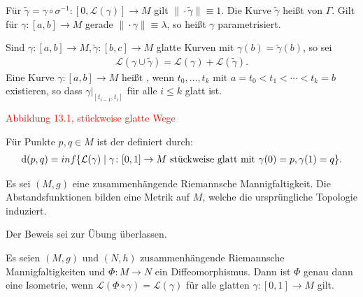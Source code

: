 Für $\tilde\gamma = \gamma \circ \sigma^{-1}\colon [0,\mathcal L(\gamma)] \to M$ gilt $\|\cdot\tilde\gamma\| \equiv 1$.
Die Kurve $\tilde \gamma$ heißt  von $\Gamma$.
Gilt für $\gamma \colon [a,b] \to M$ gerade $\|\cdot\gamma\| \equiv \lambda$, so heißt $\gamma$  parametrisiert.

Sind $\gamma \colon [a,b] \to M, \tilde \gamma \colon [b,c] \to M$ glatte Kurven mit $\gamma(b) = \tilde \gamma(b)$, so sei
\begin{align*}
  \mathcal L(\gamma \cup \tilde\gamma) = \mathcal L(\gamma) + \mathcal L(\tilde \gamma).
\end{align*}
Eine Kurve $\gamma \colon [a,b] \to M$ heißt , wenn $t_0, \ldots, t_k$ mit $a = t_0 < t_1 < \cdots < t_k = b$ existieren, so dass $\gamma|_{[t_{i-1},t_i]}$ für alle $i \leq k$ glatt ist.

\textcolor{red}{Abbildung 13.1, stückweise glatte Wege}

\begin{Dfn}
  Für Punkte $p, q \in M$ ist der  definiert durch:
  \begin{align*}
    \mathrm{d}(p,q) = inf\{ \mathcal L(\gamma) \mid \gamma \colon [0,1] \to M \text{ stückweise glatt mit } \gamma(0) = p, \gamma(1) = q\}.
  \end{align*}
\end{Dfn}

\begin{Satz}
  Es sei $(M,g)$ eine zusammenhängende Riemannsche Mannigfaltigkeit.
  Die Abstandsfunktionen bilden eine Metrik auf $M$, welche die ursprüngliche Topologie induziert.
\end{Satz}

Der Beweis sei zur Übung überlassen.

\begin{Satz}
  Es seien $(M,g)$ und $(N,h)$ zusammenhängende Riemannsche Mannigfaltigkeiten und $\Phi \colon M \to N$ ein Diffeomorphismus.
  Dann ist $\Phi$ genau dann eine Isometrie, wenn $\mathcal L(\Phi \circ \gamma) = \mathcal L(\gamma)$ für alle glatten $\gamma \colon [0,1] \to M$ gilt. 
\end{Satz}

